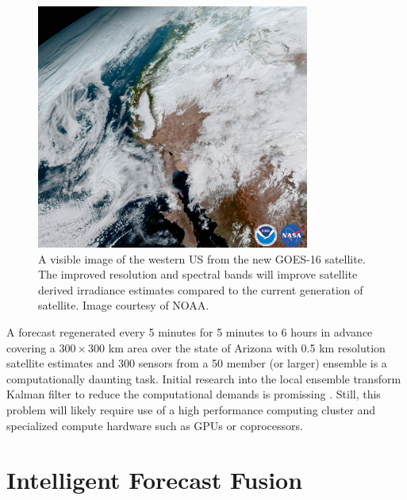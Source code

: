 \begin{figure}[h]
\centering
\includegraphics[width=0.8\textwidth]{figs/goes_cal.jpg}
\caption[An visible image of the western US from GOES-16]{A visible
image of the western US from the new GOES-16 satellite. The improved
resolution and spectral bands will improve satellite derived
irradiance estimates compared to the current generation of
satellite. Image courtesy of NOAA.}
\label{fig:goes_cal}
\end{figure}

A forecast regenerated every 5 minutes for 5 minutes to 6 hours in
advance covering a $300 \times 300$ km area over the state of Arizona
with 0.5 km resolution satellite estimates and 300 sensors from a 50
member (or larger) ensemble is a computationally daunting task.
Initial research into the local ensemble transform Kalman filter to
reduce the computational demands is promissing \citep{Hunt2007}.
Still, this problem will likely require use of a high performance
computing cluster and specialized compute hardware such as GPUs or
coprocessors.

\section{Intelligent Forecast Fusion}


